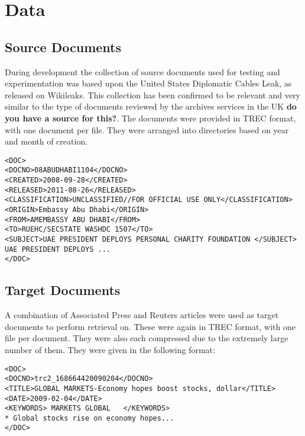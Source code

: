 \section{Data}
\subsection{Source Documents}
During development the collection of source documents used for testing and experimentation was based upon the United States Diplomatic Cables Leak, as released on Wikileaks. This collection has been confirmed to be relevant and very similar to the type of documents reviewed by the archives services in the UK \textbf{do you have a source for this?}. The documents were provided in TREC format, with one document per file. They were arranged into directories based on year and month of creation.
\begin{verbatim}
<DOC>
<DOCNO>08ABUDHABI1104</DOCNO>
<CREATED>2008-09-28</CREATED>
<RELEASED>2011-08-26</RELEASED>
<CLASSIFICATION>UNCLASSIFIED//FOR OFFICIAL USE ONLY</CLASSIFICATION>
<ORIGIN>Embassy Abu Dhabi</ORIGIN>
<FROM>AMEMBASSY ABU DHABI</FROM>
<TO>RUEHC/SECSTATE WASHDC 1507</TO>
<SUBJECT>UAE PRESIDENT DEPLOYS PERSONAL CHARITY FOUNDATION </SUBJECT>
UAE PRESIDENT DEPLOYS ...
</DOC>
\end{verbatim}
\subsection{Target Documents}
A combination of Associated Press and Reuters articles were used as target documents to perform retrieval on. These were again in TREC format, with one file per document. They were also each compressed due to the extremely large number of them.
They were given in the following format:
\begin{verbatim}
<DOC>
<DOCNO>trc2_168664420090204</DOCNO>
<TITLE>GLOBAL MARKETS-Economy hopes boost stocks, dollar</TITLE>
<DATE>2009-02-04</DATE>
<KEYWORDS> MARKETS GLOBAL   </KEYWORDS>
* Global stocks rise on economy hopes...
</DOC>
\end{verbatim}